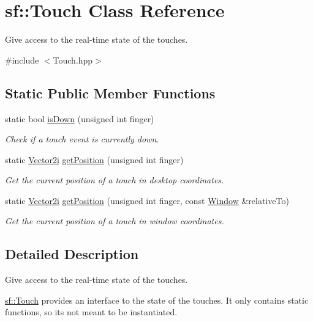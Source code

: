 \hypertarget{classsf_1_1_touch}{}\section{sf\+:\+:Touch Class Reference}
\label{classsf_1_1_touch}


Give access to the real-\/time state of the touches.  




{\ttfamily \#include $<$Touch.\+hpp$>$}

\subsection*{Static Public Member Functions}
\begin{DoxyCompactItemize}
\item 
static bool \hyperlink{classsf_1_1_touch_a2f85297123ea4e401d02c346e50d48a3}{is\+Down} (unsigned int finger)
\begin{DoxyCompactList}\small\item\em Check if a touch event is currently down. \end{DoxyCompactList}\item 
static \hyperlink{classsf_1_1_vector2}{Vector2i} \hyperlink{classsf_1_1_touch_af1b7035be709091c7475075e43e2bc23}{get\+Position} (unsigned int finger)
\begin{DoxyCompactList}\small\item\em Get the current position of a touch in desktop coordinates. \end{DoxyCompactList}\item 
static \hyperlink{classsf_1_1_vector2}{Vector2i} \hyperlink{classsf_1_1_touch_a372acaba3c7ac70fca4614c16ac4a1bb}{get\+Position} (unsigned int finger, const \hyperlink{classsf_1_1_window}{Window} \&relative\+To)
\begin{DoxyCompactList}\small\item\em Get the current position of a touch in window coordinates. \end{DoxyCompactList}\end{DoxyCompactItemize}


\subsection{Detailed Description}
Give access to the real-\/time state of the touches. 

\hyperlink{classsf_1_1_touch}{sf\+::\+Touch} provides an interface to the state of the touches. It only contains static functions, so it\textquotesingle{}s not meant to be instantiated.

